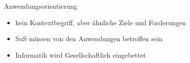 \documentclass{article}
\begin{document}
\begin{block}{Anwendungsorientierung}
    \begin{itemize}
        \item kein Kontextbegriff, aber ähnliche Ziele und Forderungen
        \item SuS müssen von den Anwendungen betroffen sein
        \item Informatik wird Gesellschaftlich eingebettet
    \end{itemize}
\end{block}
\end{document}
